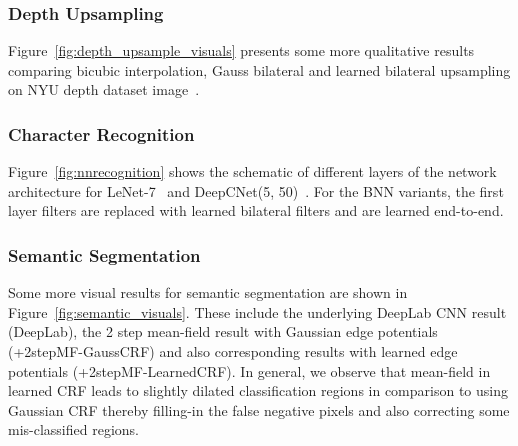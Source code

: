 \subsubsection{Depth Upsampling}
\label{sec:depth_upsample_extra}

Figure~\ref{fig:depth_upsample_visuals} presents some more qualitative results comparing bicubic interpolation, Gauss
bilateral and learned bilateral upsampling on NYU depth dataset image~\cite{silberman2012indoor}.

\subsubsection{Character Recognition}\label{sec:app_character}

 Figure~\ref{fig:nnrecognition} shows the schematic of different layers
 of the network architecture for LeNet-7~\cite{lecun1998mnist}
 and DeepCNet(5, 50)~\cite{ciresan2012multi,graham2014spatially}. For the BNN variants, the first layer filters are replaced
 with learned bilateral filters and are learned end-to-end.

\subsubsection{Semantic Segmentation}\label{sec:app_semantic_segmentation}
\label{sec:semantic_bnn_extra}

Some more visual results for semantic segmentation are shown in Figure~\ref{fig:semantic_visuals}.
These include the underlying DeepLab CNN\cite{chen2014semantic} result (DeepLab),
the 2 step mean-field result with Gaussian edge potentials (+2stepMF-GaussCRF)
and also corresponding results with learned edge potentials (+2stepMF-LearnedCRF).
In general, we observe that mean-field in learned CRF leads to slightly dilated
classification regions in comparison to using Gaussian CRF thereby filling-in the
false negative pixels and also correcting some mis-classified regions.

